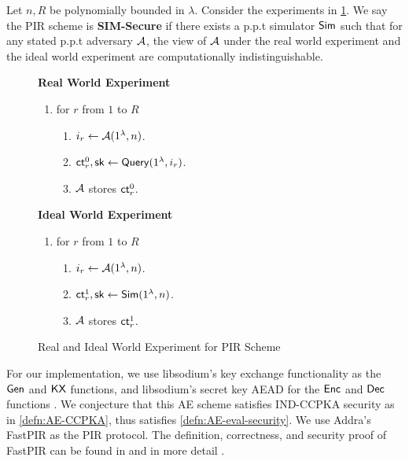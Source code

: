\begin{definition}
\label{defn:PIR-SIM-security}
Let $n, R$ be polynomially bounded in $\lambda$. Consider the experiments in \cref{expr:pir-real-ideal-world}. We say the PIR scheme is \textbf{SIM-Secure} if there exists a p.p.t simulator $\mathsf{Sim}$ such that for any stated p.p.t adversary $\mathcal{A}$, the view of $\mathcal{A}$ under the real world experiment and the ideal world experiment are computationally indistinguishable. 

\begin{figure}[h!]
\begin{framed}
\textbf{Real World Experiment}
\begin{enumerate}
    \item for $r$ from $1$ to $R$
    \begin{enumerate}
        \item $i_r \leftarrow \mathcal{A}(1^{\lambda}, n)$.
        \item $\mathsf{ct}_r^0, {\mathsf{sk}} \leftarrow \mathsf{Query}(1^{\lambda}, i_r)$.
        \item $\mathcal{A}$ stores $\mathsf{ct}_r^0$.
    \end{enumerate}
\end{enumerate}
\textbf{Ideal World Experiment}
\begin{enumerate}
    \item for $r$ from $1$ to $R$
    \begin{enumerate}
        \item $i_r \leftarrow \mathcal{A}(1^{\lambda}, n)$.
        \item $\mathsf{ct}_r^1, {\mathsf{sk}} \leftarrow \mathsf{Sim}(1^{\lambda}, n)$.
        \item $\mathcal{A}$ stores $\mathsf{ct}_r^1$.
    \end{enumerate}
\end{enumerate}
\end{framed}
\caption{Real and Ideal World Experiment for PIR Scheme}
\label{expr:pir-real-ideal-world}
\end{figure}
\end{definition}
For our implementation, we use libsodium's key exchange functionality as the $\mathsf{Gen}$ and $\mathsf{KX}$ functions, and libsodium's secret key AEAD for the $\mathsf{Enc}$ and $\mathsf{Dec}$ functions \cite{libsodium}. We conjecture that this AE scheme satisfies IND-CCPKA security as in \cref{defn:AE-CCPKA}, thus satisfies \cref{defn:AE-eval-security}. We use Addra's FastPIR as the PIR protocol. The definition, correctness, and security proof of FastPIR can be found in \cite[Section 4]{ahmad2021addra} and in more detail \cite{angel2018thesis}.

